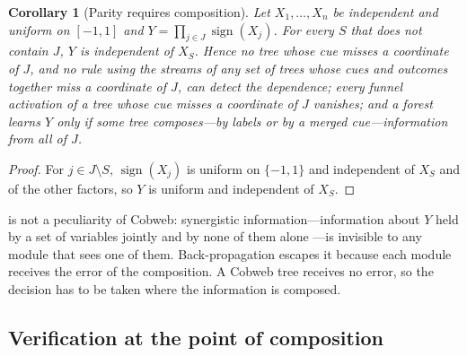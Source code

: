\documentclass[11pt]{article}
\newtheorem{corollary}[theorem]{Corollary}
\theoremstyle{definition}
\theoremstyle{remark}
\begin{document}
\begin{corollary}[Parity requires composition]\label{cor:parity}
Let $X_1,\dots,X_n$ be independent and uniform on $[-1,1]$ and
$Y=\prod_{j\in J}\operatorname{sign}(X_j)$.  For every $S$ that does not contain $J$,
$Y$ is independent of $X_S$.  Hence no tree whose cue misses a coordinate of $J$, and no rule using the streams of
any set of trees whose cues and outcomes together miss a coordinate of $J$, can detect the
dependence; every funnel activation of a tree whose cue misses a coordinate of $J$
vanishes; and a forest learns $Y$ only if some tree composes---by labels or by a merged
cue---information from all of $J$.
\end{corollary}
\begin{proof}
For $j\in J\setminus S$, $\operatorname{sign}(X_j)$ is uniform on $\{-1,1\}$ and
independent of $X_S$ and of the other factors, so $Y$ is uniform and independent of $X_S$.
\end{proof}

 is not a peculiarity of Cobweb: synergistic information---information
about $Y$ held by a set of variables jointly and by none of them alone
\citep{williams2010}---is invisible to any module that sees one of them.  Back-propagation
escapes it because each module receives the error of the composition.  A Cobweb tree
receives no error, so the decision has to be taken where the information is composed.

\subsection{Verification at the point of composition}
\end{document}
